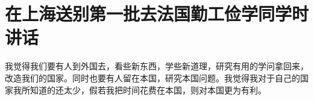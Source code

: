 \section{在上海送别第一批去法国勤工俭学同学时讲话}



我觉得我们要有人到外国去，看些新东西，学些新道理，研究有用的学问拿回来，改造我们的国家。同时也要有人留在本国，研究本国问题。我觉得我对于自己的国家我所知道的还太少，假若我把时间花费在本国，则对本国更为有利。

